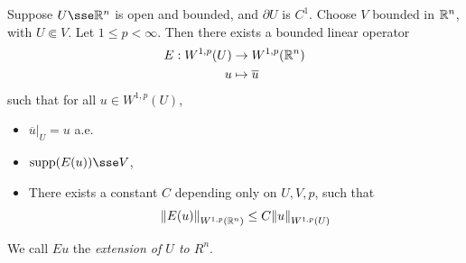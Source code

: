 \documentclass{article}
\begin{document}
\begin{theorem}
     Suppose \(U \sse \R^n\) is open and bounded, and \(\partial U\) is \(C^1\). Choose \(V\) bounded in \(\mathbb{R}^n\), with \(U \Subset V\). Let \(1 \le p < \infty\). Then there exists a bounded linear operator
    \begin{align*}
        E : W^{1, p}(U) &\to W^{1, p}(\mathbb{R}^n) \\
        u &\mapsto \overline u
    \end{align*}
    such that for all \(u \in W^{1, p}(U)\),
    \begin{itemize}[(i)]
        \item \(\overline{u}\vert_U = u\) a.e.
        \item \(\Supp(E(u)) \sse V\),
        \item There exists a constant \(C\) depending only on \(U, V, p\), such that \[\norm{E(u)}_{W^{1,p}(\mathbb{R}^n)} \le C\norm{u}_{W^{1, p}(U)}\]
    \end{itemize}

    We call \(Eu\) the \emph{extension of \(U\) to \(R^n\)}.
\end{theorem}
\end{document}
